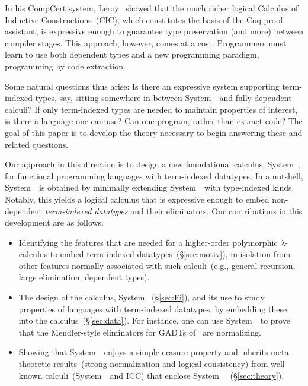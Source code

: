 In his CompCert system, Leroy~\cite{Leroy-Compcert-CACM} showed that the
much richer logical Calculus of Inductive Constructions~(CIC), which
constitutes the basis of the Coq proof assistant, is expressive enough to
guarantee type preservation (and more) between compiler stages.  This
approach, however, comes at a cost.  Programmers must learn to use both
dependent types and a new programming paradigm, programming by code
extraction.

Some natural questions thus arise: Is there an expressive system
supporting term-indexed types, say, sitting somewhere in between
System~\Fw\ and fully dependent calculi? 
If only term-indexed types are needed to maintain properties
of interest, is there a language one can use?
Can one program, rather than extract code? 
The goal of this paper is to develop the theory necessary to begin
answering these and related questions.  

Our approach in this direction is to design a new foundational calculus,
System~\Fi, for functional programming languages with term-indexed
datatypes.  In a nutshell, System~\Fi\ is obtained by minimally extending
System~\Fw\ with type-indexed kinds.  Notably, this yields a logical
calculus that is expressive enough to embed non-dependent
\emph{term-indexed datatypes} and their eliminators. Our contributions in
this development are as follows.\vspace*{-2pt}
\begin{itemize}
\item 
  Identifying the features that are needed for a higher-order polymorphic
  $\lambda$-calculus to embed term-indexed datatypes~(\S\ref{sec:motiv}),
  in isolation from other features normally associated with such
  calculi~(e.g., general recursion, large elimination, dependent types).
  \vspace*{-1pt}
\item 
  The design of the calculus, System \Fi\ (\S\ref{sec:Fi}), and its use to
  study properties of languages with term-indexed datatypes, by embedding
  these into the calculus~(\S\ref{sec:data}).  For instance, one can use
  System~\Fi\ to prove that the Mendler-style eliminators
  for GADTs of~\cite{AhnShe11} are normalizing.
  \vspace*{-1pt}
\item 
  Showing that System~\Fi\ enjoys a simple erasure
  property %
  and inherits meta-theoretic
  results~(strong normalization and logical consistency) from well-known
  calculi~(System~\Fw\ and ICC) that enclose System~\Fi~%
(\S\ref{sec:theory}).
\end{itemize}\vspace*{-3pt}

